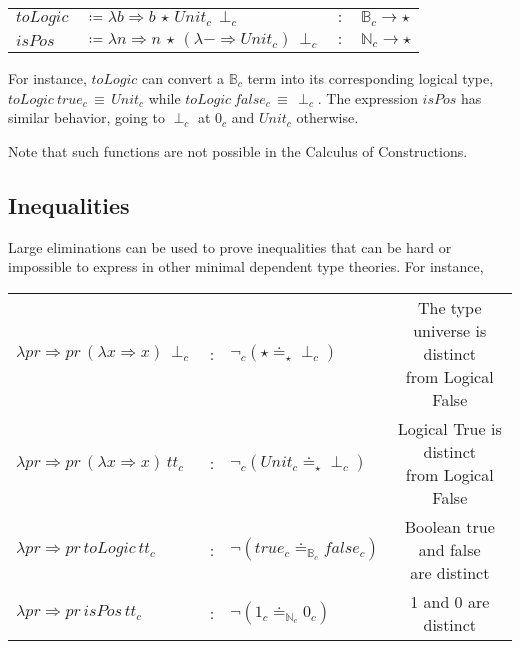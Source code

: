 \begin{tabular}{llll}
  $toLogic$ & $\coloneqq\lambda b\Rightarrow b\,\star\,Unit_{c}\,\perp_{c}$ & $:$ & $\mathbb{B}_{c}\rightarrow\star$\tabularnewline
  $isPos$ & $\coloneqq\lambda n\Rightarrow n\,\star\,(\lambda-\Rightarrow Unit_{c})\,\perp_{c}$ & $:$ & $\mathbb{N}_{c}\rightarrow\star$\tabularnewline
\end{tabular}
  
For instance, $toLogic$ can convert a $\mathbb{B}_{c}$ term into its corresponding logical type, $toLogic\ true_{c}\,\equiv\, Unit_{c}$ while $toLogic\ false_{c}\, \equiv\, \perp_{c}$.
The expression $isPos$ has similar behavior, going to $\perp_{c}$ at $0_{c}$ and $Unit_{c}$ otherwise.

Note that such functions are not possible in the Calculus of Constructions.

\subsection{Inequalities}

Large eliminations can be used to prove inequalities that can be hard or impossible to express in other minimal dependent type theories. %
For instance,\newline

\begin{tabular}{lclc}
  $\lambda pr\Rightarrow pr\,\left(\lambda x\Rightarrow x\right)\,\perp_{c}$ & : & $\lnot_{c}(\star\doteq_{\star}\perp_{c})$ & \makecell{The type universe is distinct\\ from Logical False}\tabularnewline
  $\lambda pr\Rightarrow pr\,\left(\lambda x\Rightarrow x\right)\,tt_{c}$ & : & $\lnot_{c}(Unit_{c}\doteq_{\star}\perp_{c})$ & \makecell{Logical True is distinct\\ from Logical False}\tabularnewline
  $\lambda pr\Rightarrow pr\,toLogic\,tt_{c}$ & : & $\lnot (true_{c}\doteq_{\mathbb{B}_{c}}false_{c})$ &  \makecell{Boolean true and false\\ are distinct}\tabularnewline
  $\lambda pr\Rightarrow pr\,isPos\,tt_{c}$ & : & $\lnot (1_{c}\doteq_{\mathbb{N}_{c}}0_{c})$ & 1 and 0 are distinct\tabularnewline
\end{tabular}\newline
  

